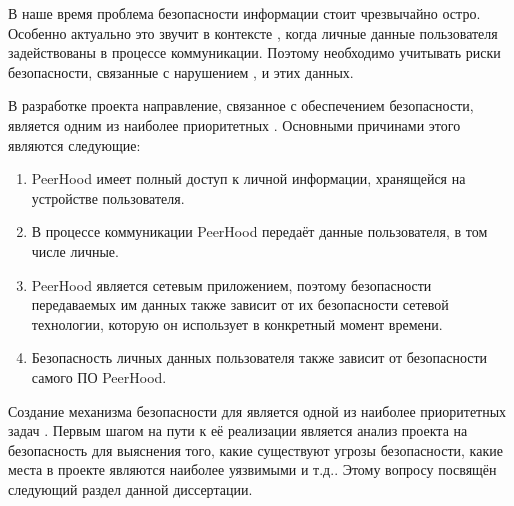 %
В наше время проблема безопасности информации стоит чрезвычайно остро.
%
Особенно актуально это звучит в контексте , когда личные данные пользователя задействованы в процессе коммуникации.
%
Поэтому необходимо учитывать риски безопасности, связанные с нарушением ,  и  этих данных.

%
В разработке проекта  направление, связанное с обеспечением безопасности, является одним из наиболее приоритетных . 
%
Основными причинами этого являются следующие:
\begin{enumerate}

	\item PeerHood имеет полный доступ к личной информации, хранящейся на устройстве пользователя.

	\item В процессе коммуникации PeerHood передаёт данные пользователя, в том числе личные.

	\item PeerHood является сетевым приложением, поэтому безопасности передаваемых им данных также зависит от их безопасности сетевой технологии, которую он использует в конкретный момент времени.

	\item Безопасность личных данных пользователя также зависит от безопасности самого ПО PeerHood.
\end{enumerate}

%
Создание механизма безопасности для  является одной из наиболее приоритетных задач .
%
Первым шагом на пути к её реализации является анализ проекта на безопасность для выяснения того, какие существуют угрозы безопасности, какие места в проекте являются наиболее уязвимыми и т.д..
%
Этому вопросу посвящён следующий раздел данной диссертации.